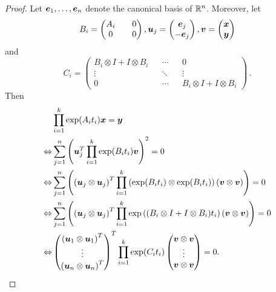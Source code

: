 \begin{proof}
Let $\boldsymbol{e}_{1}, \ldots, \boldsymbol{e}_{n}$ denote the canonical basis of $\mathbb{R}^{n}$. Moreover, let
\begin{equation*}
B_{i} = \begin{pmatrix} A_{i} && 0 \\ 0 && 0 \end{pmatrix},
\boldsymbol{u}_{j} = \begin{pmatrix} \boldsymbol{e}_{j} \\ - \boldsymbol{e}_{j} \end{pmatrix},
\boldsymbol{v} = \begin{pmatrix} \boldsymbol{x} \\ \boldsymbol{y} \end{pmatrix}
\end{equation*}
and
\begin{equation*}
C_{i} = \begin{pmatrix} B_{i} \otimes I + I \otimes B_{i} && \cdots && 0 \\ \vdots && \ddots && \vdots \\ 0 && \cdots && B_{i} \otimes I + I \otimes B_{i} \end{pmatrix} \, .
\end{equation*}
Then
\begin{align*}
&\prod \limits_{i=1}^{k} \exp(A_{i} t_{i}) \boldsymbol{x} = \boldsymbol{y} \\
\Leftrightarrow &\sum \limits_{j=1}^{n} \left( \boldsymbol{u}_{j}^{T} \prod \limits_{i=1}^{k} \exp(B_{i} t_{i}) \boldsymbol{v} \right)^{2} = 0 \\
\Leftrightarrow &\sum \limits_{j=1}^{n} \left( \left( \boldsymbol{u}_{j} \otimes \boldsymbol{u}_{j} \right)^{T} \prod \limits_{i=1}^{k} \left( \exp( B_{i} t_{i} ) \otimes \exp(B_{i} t_{i}) \right) \left( \boldsymbol{v} \otimes \boldsymbol{v} \right) \right) = 0 \\
\Leftrightarrow &\sum \limits_{j=1}^{n} \left( \left( \boldsymbol{u}_{j} \otimes \boldsymbol{u}_{j} \right)^{T} \prod \limits_{i=1}^{k} \exp\left((B_{i} \otimes I + I \otimes B_{i}) t_{i} \right) \left( \boldsymbol{v} \otimes \boldsymbol{v} \right) \right) = 0 \\
\Leftrightarrow &\begin{pmatrix} \left(\boldsymbol{u}_{1} \otimes \boldsymbol{u}_{1}\right)^{T} \\ \vdots \\ \left(\boldsymbol{u}_{n} \otimes \boldsymbol{u}_{n}\right)^{T} \end{pmatrix}^{T} \prod \limits_{i=1}^{k} \exp( C_{i} t_{i} ) \begin{pmatrix} \boldsymbol{v} \otimes \boldsymbol{v} \\ \vdots \\ \boldsymbol{v} \otimes \boldsymbol{v} \end{pmatrix} = 0 .
\end{align*}


\end{proof}
